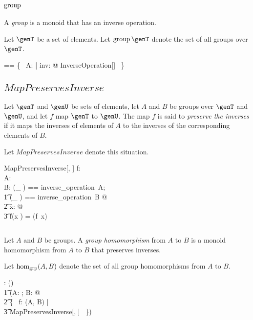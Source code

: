 \documentclass{amsart}
\begin{document}
\subsection{$\operatorname{group}$}

A {\em group} is a monoid that has an inverse operation.

Let $\genT$ be a set of elements.
Let $\group \genT$ denote the set of all groups over $\genT$.

\begin{zed}
\group \genT == \{~ A: \monoid \genT | \exists inv: \genT \fun \genT @ InverseOperation[\genT] ~\}
\end{zed}

\subsection{$MapPreservesInverse$}

Let $\genT$ and $\genU$ be sets of elements,
let $A$ and $B$ be groups over $\genT$ and $\genU$, 
and let $f$ map $\genT$ to $\genU$.
The map $f$ is said to {\em preserve the inverses} if it maps the inverses of elements of $A$
to the inverses of the corresponding elements of $B$.

Let $MapPreservesInverse$ denote this situation.

\begin{schema}{MapPreservesInverse}[\genT, \genU]
f: \genT \fun \genU \\
A: \group \genT \\
B: \group \genU
\where
\LET (\_ \invG) == inverse\_operation~A; \\
\t1	(\_ \daggerG) == inverse\_operation~B @ \\
\t2		\forall x: \genT @ \\
\t3			f(x \invG) = (f~x) \daggerG
\end{schema}

\subsection{}

Let $A$ and $B$ be groups.
A {\em group homomorphism} from $A$ to $B$ is a monoid homomorphism
from $A$ to $B$ that preserves inverses.

Let $\operatorname{hom_{grp}}(A, B)$ denote the set of all group homomorphisms from $A$ to $B$.

\begin{gendef}[\genT, \genU]
\homGroup: \group \genT \cross \group \genU \fun \power (\genT \fun \genU)
\where
\homGroup = \\
\t1	(\lambda A: \group \genT; B: \group \genU @ \\
\t2		\{~ f: \homMonoid(A, B) | \\
\t3			MapPreservesInverse[\genT, \genU] ~\})
\end{gendef}
\end{document}
